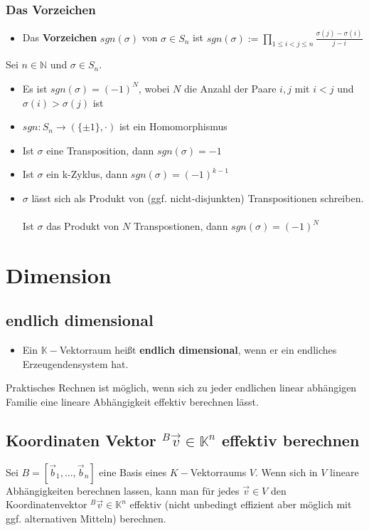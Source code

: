 \documentclass[titlepage]{article}
\newcommand{\K}{\mathbb{K}}
\newcommand{\N}{\mathbb{N}}
\newcommand{\1}{\mathbb{1}}
\newcommand{\0}{\mathbb{0}}
\begin{document}
			\subsubsection{Das Vorzeichen}
				\begin{itemize}
					\item Das \textbf{Vorzeichen} $sgn(\sigma)$ von $\sigma\in S_n$ ist $sgn(\sigma):=\prod\limits_{1\le i<j\le n}$$\frac{\sigma(j)-\sigma(i)}{j-i}$
				\end{itemize}
				Sei $n\in\N$ und $\sigma\in S_n$.
				\begin{itemize}
					\item Es ist $sgn(\sigma)=(-1)^N$, wobei $N$ die Anzahl der Paare $i,j$ mit $i<j$ und $\sigma(i)>\sigma(j)$ ist
					\item $sgn:S_n\rightarrow(\{\pm1\},\cdot)$ ist ein Homomorphismus
					\item Ist $\sigma$ eine Transposition, dann $sgn(\sigma)=-1$
					\item Ist $\sigma$ ein k-Zyklus, dann $sgn(\sigma)=(-1)^{k-1}$
					\item $\sigma$ lässt sich als Produkt von (ggf. nicht-disjunkten) Transpositionen schreiben.\\\\
					Ist $\sigma$ das Produkt von $N$ Transpostionen, dann $sgn(\sigma)=(-1)^N$
				\end{itemize}
		\section{Dimension}
			\subsection{endlich dimensional}
				\begin{itemize}
					\item Ein $\K-$Vektorraum heißt \textbf{endlich dimensional}, wenn er ein endliches Erzeugendensystem hat.
				\end{itemize}
				Praktisches Rechnen ist möglich, wenn sich zu jeder endlichen linear abhängigen Familie eine lineare Abhängigkeit effektiv berechnen lässt.
			\subsection{Koordinaten Vektor $^B\vec{v}\in\K^n$ effektiv berechnen}
				Sei $B=[\vec{b}_1,...,\vec{b}_n]$ eine Basis eines $K-$Vektorraums $V$. Wenn sich in $V$ lineare Abhängigkeiten berechnen lassen, kann man für jedes $\vec{v}\in V$ den Koordinatenvektor $^B\vec{v}\in\K^n$ effektiv (nicht unbedingt effizient aber möglich mit ggf. alternativen Mitteln) berechnen.
\end{document}
